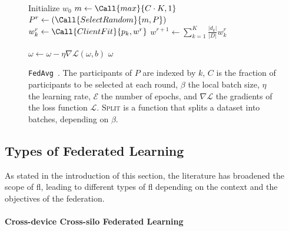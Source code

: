 \begin{figure}
  \centering
  \begin{minipage}{.8\textwidth}
    
    \begin{algorithm}[H]
      \caption{
        \texttt{FedAvg}~\cite{mcmahan_Communicationefficientlearningdeep_2017}.
        The participants of $P$ are indexed by $k$, $C$ is the fraction of participants to be selected at each round, $\beta$ the local batch size, $\eta$ the learning rate, $\mathcal{E}$ the number of epochs, and $\nabla\mathcal{L}$ the gradients of the loss function $\mathcal{L}$. \textsc{Split} is a function that splits a dataset into batches, depending on $\beta$.
        \label{alg:fedavg}
      }
      \begin{algorithmic}[1]
      
        \State Initialize $w_0$
          \State $ m \gets \Call{max}{C \cdot K, 1} $
          \State $ P^r \gets (\Call{SelectRandom}{m, P}) $
            \State $ w_k^r \gets \Call{ClientFit}{p_k, w^r} $
          \EndFor
          \State $ w^{r+1} \gets \sum_{k=1}^{K} \frac{|d_k|}{|D|} w_k^r $
        \EndFor
    
        \Statex
              \State $ \omega \gets \omega - \eta \nabla \mathcal{L}(\omega,b) $
            \EndFor
          \EndFor
          \Statex
          \State \Return $\omega$
        \EndFunction
      \end{algorithmic}
    \end{algorithm}
  \end{minipage}
\end{figure}


\subsection{Types of Federated Learning\label{sec:bg.fl.types}}

As stated in the introduction of this section, the literature has broadened the scope of \gls{fl}, leading to different types of \gls{fl} depending on the context and the objectives of the federation.

\paragraph{Cross-device \vs Cross-silo Federated Learning}

